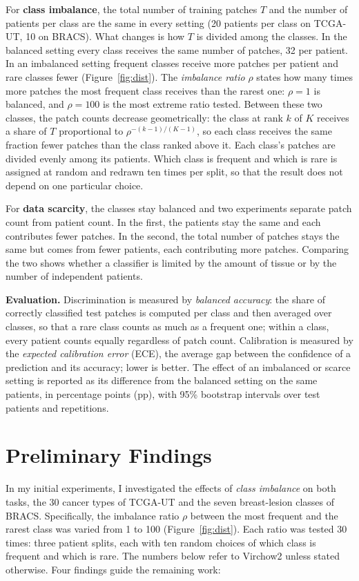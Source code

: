 \documentclass[11pt,a4paper]{article}
\begin{document}
For \textbf{class imbalance}, the total number of training patches $T$ and the number of patients per class are the same in every setting (20 patients per class on TCGA-UT, 10 on BRACS).
What changes is how $T$ is divided among the classes.
In the balanced setting every class receives the same number of patches, 32 per patient.
In an imbalanced setting frequent classes receive more patches per patient and rare classes fewer (Figure~\ref{fig:dist}).
The \emph{imbalance ratio} $\rho$ states how many times more patches the most frequent class receives than the rarest one: $\rho=1$ is balanced, and $\rho=100$ is the most extreme ratio tested.
Between these two classes, the patch counts decrease geometrically: the class at rank $k$ of $K$ receives a share of $T$ proportional to $\rho^{-(k-1)/(K-1)}$, so each class receives the same fraction fewer patches than the class ranked above it.
Each class's patches are divided evenly among its patients.
Which class is frequent and which is rare is assigned at random and redrawn ten times per split, so that the result does not depend on one particular choice.

For \textbf{data scarcity}, the classes stay balanced and two experiments separate patch count from patient count.
In the first, the patients stay the same and each contributes fewer patches.
In the second, the total number of patches stays the same but comes from fewer patients, each contributing more patches.
Comparing the two shows whether a classifier is limited by the amount of tissue or by the number of independent patients.

\textbf{Evaluation.}
Discrimination is measured by \emph{balanced accuracy}: the share of correctly classified test patches is computed per class and then averaged over classes, so that a rare class counts as much as a frequent one; within a class, every patient counts equally regardless of patch count.
Calibration is measured by the \emph{expected calibration error} (ECE), the average gap between the confidence of a prediction and its accuracy; lower is better.
The effect of an imbalanced or scarce setting is reported as its difference from the balanced setting on the same patients, in percentage points (pp), with 95\% bootstrap intervals over test patients and repetitions.

\section{Preliminary Findings}
In my initial experiments, I investigated the effects of \emph{class imbalance} on both tasks, the 30 cancer types of TCGA-UT and the seven breast-lesion classes of BRACS.
Specifically, the imbalance ratio $\rho$ between the most frequent and the rarest class was varied from 1 to 100 (Figure~\ref{fig:dist}).
Each ratio was tested 30 times: three patient splits, each with ten random choices of which class is frequent and which is rare.
The numbers below refer to Virchow2 unless stated otherwise.
Four findings guide the remaining work:
\end{document}
